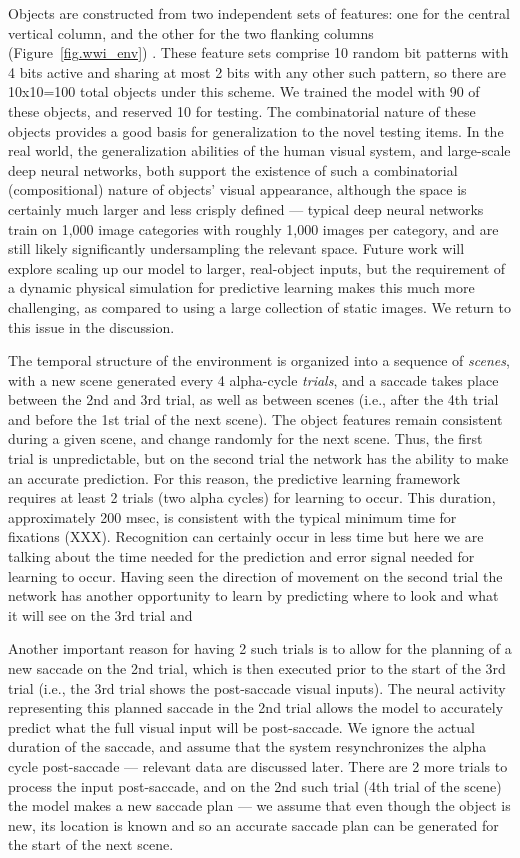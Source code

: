 \documentclass[11pt,twoside]{article}
\newif\myifpdf
\begin{document}
Objects are constructed from two independent sets of features: one for the central vertical column, and the other for the two flanking columns  (Figure~\ref{fig.wwi_env}) .  These feature sets comprise 10 random bit patterns with 4 bits active and sharing at most 2 bits with any other such pattern, so there are 10x10=100 total objects under this scheme.  We trained the model with 90 of these objects, and reserved 10 for testing.  The combinatorial nature of these objects provides a good basis for generalization to the novel testing items.  In the real world, the generalization abilities of the human visual system, and large-scale deep neural networks, both support the existence of such a combinatorial (compositional) nature of objects' visual appearance, although the space is certainly much larger and less crisply defined --- typical deep neural networks train on 1,000 image categories with roughly 1,000 images per category, and are still likely significantly undersampling the relevant space.  Future work will explore scaling up our model to larger, real-object inputs, but the requirement of a dynamic physical simulation for predictive learning makes this much more challenging, as compared to using a large collection of static images.  We return to this issue in the discussion.

The temporal structure of the environment is organized into a sequence of {\em scenes}, with a new scene generated every 4 alpha-cycle {\em trials}, and a saccade takes place between the 2nd and 3rd trial, as well as between scenes (i.e., after the 4th trial and before the 1st trial of the next scene).  The object features remain consistent during a given scene, and change randomly for the next scene.  Thus, the first trial is unpredictable, but on the second trial the network has the ability to make an accurate prediction.  For this reason, the predictive learning framework requires at least 2 trials (two alpha cycles) for learning to occur. This duration, approximately 200 msec, is consistent with the typical minimum time for fixations (XXX). Recognition can certainly occur in less time but here we are talking about the time needed for the prediction and error signal needed for learning to occur. Having seen the direction of movement on the second trial the network has another opportunity to learn by predicting where to look and what it will see on the 3rd trial and 


Another important reason for having 2 such trials is to allow for the planning of a new saccade on the 2nd trial, which is then executed prior to the start of the 3rd trial (i.e., the 3rd trial shows the post-saccade visual inputs).  The neural activity representing this planned saccade in the 2nd trial allows the model to accurately predict what the full visual input will be post-saccade.  We ignore the actual duration of the saccade, and assume that the system resynchronizes the alpha cycle post-saccade --- relevant data are discussed later.  There are 2 more trials to process the input post-saccade, and on the 2nd such trial (4th trial of the scene) the model makes a new saccade plan --- we assume that even though the object is new, its location is known and so an accurate saccade plan can be generated for the start of the next scene.
\end{document}
